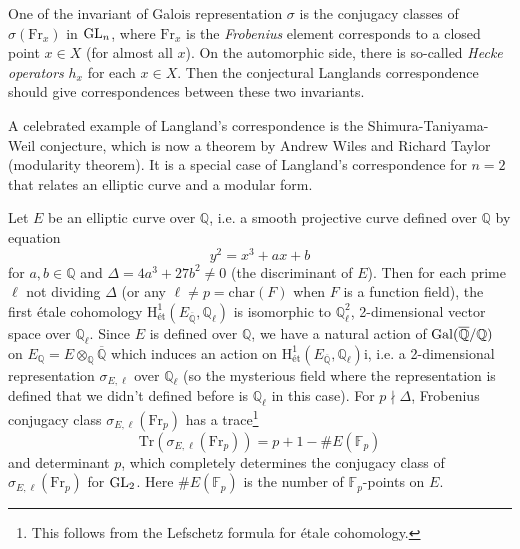 \begin{enumerate}
    One of the invariant of Galois representation $\sigma$ is the conjugacy classes of $\sigma(\mathrm{Fr}_{x})$ in $\operatorname{\mathrm{GL}}_{n}$, where
    $\mathrm{Fr}_{x}$ is the \emph{Frobenius} element corresponds to a closed point $x \in X$ (for almost all $x$).
    On the automorphic side, there is so-called \emph{Hecke operators} $h_{x}$ for each $x \in X$.
    Then the conjectural Langlands correspondence should give correspondences between these two invariants.
    
\end{enumerate}

A celebrated example of Langland's correspondence is the Shimura-Taniyama-Weil conjecture, which is now a theorem by Andrew Wiles and Richard Taylor (modularity theorem).
It is a special case of Langland's correspondence for $n = 2$ that  relates an elliptic curve and a modular form.

Let $E$ be an elliptic curve over $\mathbb{Q}$, i.e. a smooth projective curve defined over $\mathbb{Q}$ by equation
$$
    y^{2} = x^{3} + ax + b
$$
for $a, b \in \mathbb{Q}$ and $\Delta = 4a^{3} + 27b^{2} \neq 0$ (the discriminant of $E$).
Then for each prime $\ell$ not dividing $\Delta$ (or any $\ell \neq p = \mathrm{char}(F)$ when $F$ is a function field),  the first \'etale cohomology $\mathrm{H}^{1}_{\text{\'et}}(E_{\overline{\mathbb{Q}}}, \mathbb{Q}_{\ell})$ is isomorphic to $\mathbb{Q}_{\ell}^{2}$,
2-dimensional vector space over $\mathbb{Q}_{\ell}$.
Since $E$ is defined over $\mathbb{Q}$, we have a natural action of $\operatorname{\mathrm{Gal}}(\overline{\mathbb{Q}}/\mathbb{Q})$ on $E_{\mathbb{Q}} = E \otimes_{\mathbb{Q}}\overline{\mathbb{Q}}$ which
induces an action on $\mathrm{H}^{1}_{\text{\'et}}(E_{\overline{\mathbb{Q}}}, \mathbb{Q}_{\ell})$i, i.e. a 2-dimensional representation $\sigma_{E, \ell}$ over $\mathbb{Q}_{\ell}$
(so the mysterious field where the representation is defined that we didn't defined before is $\mathbb{Q}_{\ell}$ in this case).
For $p \nmid \Delta$, Frobenius conjugacy class $\sigma_{E, \ell}(\mathrm{Fr}_{p})$ has a trace\footnote{This follows from the Lefschetz formula for \'etale cohomology.}
$$
    \mathrm{Tr}(\sigma_{E, \ell}(\mathrm{Fr}_{p})) = p + 1 - \# E(\mathbb{F}_{p})
$$
and determinant $p$, which completely determines the conjugacy class of $\sigma_{E, \ell}(\mathrm{Fr}_{p})$ for $\operatorname{\mathrm{GL}}_{2}$.
Here $\#E(\mathbb{F}_{p})$ is the number of $\mathbb{F}_{p}$-points on $E$.

